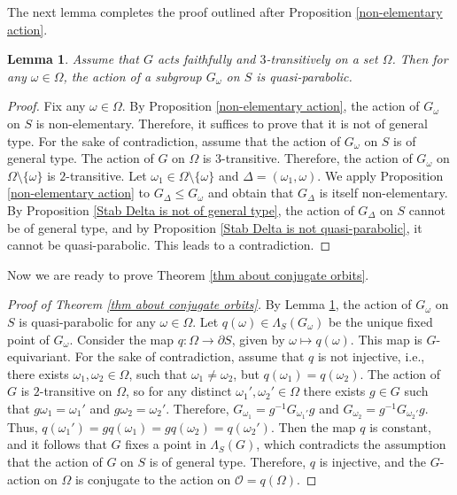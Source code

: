 \documentclass[11pt,letterpaper]{article}
\newtheorem{lem}[thm]{Lemma}
\theoremstyle{definition}
\theoremstyle{remark}
\begin{document}
The next lemma completes the proof outlined after Proposition \ref{non-elementary action}.

\begin{lem}\label{The action of a stabilizer of a point is quasi-parabolic}
    Assume that $G$ acts faithfully and $3$-transitively on a set $\Omega$. Then for any $\omega \in \Omega$, the action of a subgroup $G_\omega$ on $S$ is quasi-parabolic.
\end{lem}

\begin{proof}
    Fix any $\omega \in \Omega$. By Proposition \ref{non-elementary action}, the action of $G_\omega$ on $S$ is non-elementary. Therefore, it suffices to prove that it is not of general type. For the sake of contradiction, assume that the action of $G_\omega$ on $S$ is of general type. The action of $G$ on $\Omega$ is $3$-transitive. Therefore, the action of $G_\omega$ on $\Omega \setminus \{\omega\}$ is $2$-transitive. Let $\omega_1 \in  \Omega \setminus \{\omega\}$ and $\Delta=(\omega_1, \omega)$. We apply Proposition \ref{non-elementary action} to $G_\Delta \leq G_\omega$ and obtain that $G_\Delta$ is itself non-elementary. By Proposition \ref{Stab Delta is not of general type}, the action of $G_\Delta$ on $S$ cannot be of general type, and by Proposition \ref{Stab Delta is not quasi-parabolic}, it cannot be quasi-parabolic. This leads to a contradiction. 
\end{proof}

Now we are ready to prove Theorem \ref{thm about conjugate orbits}.

\begin{proof}[Proof of Theorem \ref{thm about conjugate orbits}]
By Lemma \ref{The action of a stabilizer of a point is quasi-parabolic}, the action of $G_\omega$ on $S$ is quasi-parabolic for any $\omega \in \Omega$. Let $q(\omega) \in \Lambda_S(G_\omega)$ be the unique fixed point of $G_\omega$. Consider the map $q \colon \Omega \rightarrow \partial S$, given by $\omega \mapsto q(\omega)$. This map is $G$-equivariant. For the sake of contradiction, assume that $q$ is not injective, i.e., there exists $\omega_1, \omega_2 \in \Omega$, such that $\omega_1 \neq \omega_2$, but  $q(\omega_1)=q(\omega_2)$. The action of $G$ is $2$-transitive on $\Omega$, so for any distinct $\omega_1', \omega_2' \in \Omega$ there exists $g \in G$ such that $g\omega_1=\omega_1'$ and $g\omega_2=\omega_2'$. Therefore, $G_{\omega_1}=g^{-1}G_{\omega_1'}g$ and $G_{\omega_2}=g^{-1}G_{\omega_2'}g$. Thus, $q(\omega_1')=gq(\omega_1)=gq(\omega_2)=q(\omega_2')$. Then the map $q$ is constant, and it follows that $G$ fixes a point in $\Lambda_S(G)$, which contradicts the assumption that the action of $G$ on $S$ is of general type. 
Therefore, $q$ is injective, and the $G$-action on $\Omega$ is conjugate to the action on $\mathcal{O}=q(\Omega)$.
\end{proof}
\end{document}

